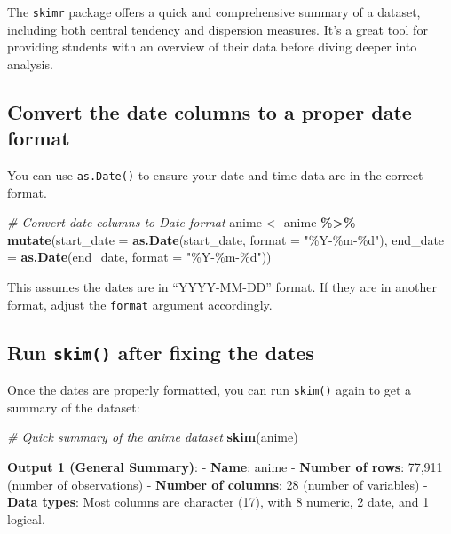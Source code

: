 \documentclass[
]{book}
\newenvironment{Shaded}{\begin{snugshade}}{\end{snugshade}}
\newcommand{\AttributeTok}[1]{\textcolor[rgb]{0.13,0.29,0.53}{#1}}
\newcommand{\CommentTok}[1]{\textcolor[rgb]{0.56,0.35,0.01}{\textit{#1}}}
\newcommand{\FunctionTok}[1]{\textcolor[rgb]{0.13,0.29,0.53}{\textbf{#1}}}
\newcommand{\NormalTok}[1]{#1}
\newcommand{\OtherTok}[1]{\textcolor[rgb]{0.56,0.35,0.01}{#1}}
\newcommand{\SpecialCharTok}[1]{\textcolor[rgb]{0.81,0.36,0.00}{\textbf{#1}}}
\newcommand{\StringTok}[1]{\textcolor[rgb]{0.31,0.60,0.02}{#1}}
\begin{document}
The \texttt{skimr} package offers a quick and comprehensive summary of a dataset, including both central tendency and dispersion measures. It's a great tool for providing students with an overview of their data before diving deeper into analysis.

\subsection{Convert the date columns to a proper date format}\label{convert-the-date-columns-to-a-proper-date-format}

You can use \texttt{as.Date()} to ensure your date and time data are in the correct format.

\begin{Shaded}
\begin{Highlighting}[]
\CommentTok{\# Convert date columns to Date format}
\NormalTok{anime }\OtherTok{\textless{}{-}}\NormalTok{ anime }\SpecialCharTok{\%\textgreater{}\%}
  \FunctionTok{mutate}\NormalTok{(}\AttributeTok{start\_date =} \FunctionTok{as.Date}\NormalTok{(start\_date, }\AttributeTok{format =} \StringTok{"\%Y{-}\%m{-}\%d"}\NormalTok{),}
         \AttributeTok{end\_date =} \FunctionTok{as.Date}\NormalTok{(end\_date, }\AttributeTok{format =} \StringTok{"\%Y{-}\%m{-}\%d"}\NormalTok{))}
\end{Highlighting}
\end{Shaded}

This assumes the dates are in ``YYYY-MM-DD'' format. If they are in another format, adjust the \texttt{format} argument accordingly.

\subsection{\texorpdfstring{Run \texttt{skim()} after fixing the dates}{Run skim() after fixing the dates}}\label{run-skim-after-fixing-the-dates}

Once the dates are properly formatted, you can run \texttt{skim()} again to get a summary of the dataset:

\begin{Shaded}
\begin{Highlighting}[]
\CommentTok{\# Quick summary of the anime dataset}
\FunctionTok{skim}\NormalTok{(anime)}
\end{Highlighting}
\end{Shaded}

\textbf{Output 1 (General Summary)}:
- \textbf{Name}: anime
- \textbf{Number of rows}: 77,911 (number of observations)
- \textbf{Number of columns}: 28 (number of variables)
- \textbf{Data types}: Most columns are character (17), with 8 numeric, 2 date, and 1 logical.
\end{document}
